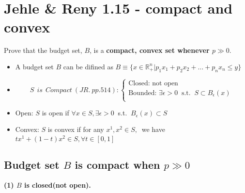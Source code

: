 \documentclass{article}
\newcommand{\R}{\mathbb{R}}
\begin{document}
\vspace{2mm}

\section{Jehle \& Reny 1.15 - compact and convex}
Prove that the budget set, $B$, is a \textbf{compact, convex set whenever $p \gg 0$}.

\begin{mdframed}[backgroundcolor=blue!20,linecolor=white]
\begin{itemize}
\item A budget set $B$ can be difined as $B \equiv \{x \in \R^n_+ | p_1x_1 + p_2x_2 + \ldots + p_nx_n \le y \}$
\item \begin{equation}
 S \  \ is \ \ Compact \ (JR. \ pp. 514):
    \begin{cases}
      \text{Closed: not open}\\
      \text{Bounded: $\exists \epsilon > 0 \ $ s.t. $\ S \subset B_{\epsilon}(x)$}\\
    \end{cases}
    \end{equation}

\item Open:  $S$ is open if $\forall x \in S, \exists \epsilon > 0 \ $ s.t. $\ B_{\epsilon}(x) \subset S$ \\
\item Convex: $S$ is convex if for any $x^1, x^2 \in S,\ $ we have $tx^1 + (1-t)x^2 \in S, \forall t \in [0,1]$
\end{itemize}
\end{mdframed}

\subsection{Budget set $B$ is compact when $p \gg 0$}

\textbf{(1) $B$ is closed(not open).}


{\centering
{}
\label{fig:1_15_close}}
\end{document}
